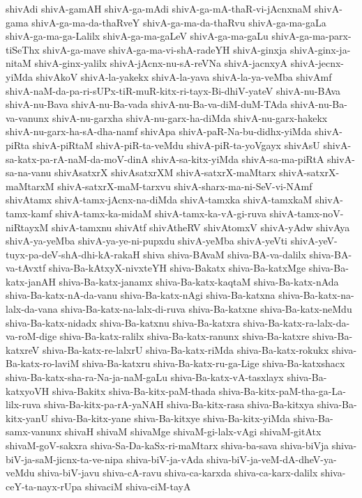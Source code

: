 {shivAdi
shivA-gamAH
shivA-ga-mAdi
shivA-ga-mA-thaR-vi-jAcnxnaM
shivA-gama
shivA-ga-ma-da-thaRveY
shivA-ga-ma-da-thaRvu
shivA-ga-ma-gaLa
shivA-ga-ma-ga-Lalilx
shivA-ga-ma-gaLeV
shivA-ga-ma-gaLu
shivA-ga-ma-parx-tiSeThx
shivA-ga-mave
shivA-ga-ma-vi-shA-radeYH
shivA-ginxja
shivA-ginx-ja-nitaM
shivA-ginx-yalilx
shivA-jAcnx-nu-sA-reVNa
shivA-jacnxyA
shivA-jecnx-yiMda
shivAkoV
shivA-la-yakekx
shivA-la-yava
shivA-la-ya-veMba
shivAmf
shivA-naM-da-pa-ri-sUPx-tiR-muR-kitx-ri-tayx-Bi-dhiV-yateV
shivA-nu-BAva
shivA-nu-Bava
shivA-nu-Ba-vada
shivA-nu-Ba-va-diM-duM-TAda
shivA-nu-Ba-va-vanunx
shivA-nu-garxha
shivA-nu-garx-ha-diMda
shivA-nu-garx-hakekx
shivA-nu-garx-ha-sA-dha-namf
shivApa
shivA-paR-Na-bu-didhx-yiMda
shivA-piRta
shivA-piRtaM
shivA-piR-ta-veMdu
shivA-piR-ta-yoVgayx
shivAsU
shivA-sa-katx-pa-rA-naM-da-moV-dinA
shivA-sa-kitx-yiMda
shivA-sa-ma-piRtA
shivA-sa-na-vanu
shivAsatxrX
shivAsatxrXM
shivA-satxrX-maMtarx
shivA-satxrX-maMtarxM
shivA-satxrX-maM-tarxvu
shivA-sharx-ma-ni-SeV-vi-NAmf
shivAtamx
shivA-tamx-jAcnx-na-diMda
shivA-tamxka
shivA-tamxkaM
shivA-tamx-kamf
shivA-tamx-ka-midaM
shivA-tamx-ka-vA-gi-ruva
shivA-tamx-noV-niRtayxM
shivA-tamxnu
shivAtf
shivAtheRV
shivAtomxV
shivA-yAdw
shivAya
shivA-ya-yeMba
shivA-ya-ye-ni-pupxdu
shivA-yeMba
shivA-yeVti
shivA-yeV-tuyx-pa-deV-shA-dhi-kA-rakaH
shiva
shiva-BAvaM
shiva-BA-va-dalilx
shiva-BA-va-tAvxtf
shiva-Ba-kAtxyX-nivxteYH
shiva-Bakatx
shiva-Ba-katxMge
shiva-Ba-katx-janAH
shiva-Ba-katx-janamx
shiva-Ba-katx-kaqtaM
shiva-Ba-katx-nAda
shiva-Ba-katx-nA-da-vanu
shiva-Ba-katx-nAgi
shiva-Ba-katxna
shiva-Ba-katx-na-lalx-da-vana
shiva-Ba-katx-na-lalx-di-ruva
shiva-Ba-katxne
shiva-Ba-katx-neMdu
shiva-Ba-katx-nidadx
shiva-Ba-katxnu
shiva-Ba-katxra
shiva-Ba-katx-ra-lalx-da-va-roM-dige
shiva-Ba-katx-ralilx
shiva-Ba-katx-ranunx
shiva-Ba-katxre
shiva-Ba-katxreV
shiva-Ba-katx-re-lalxrU
shiva-Ba-katx-riMda
shiva-Ba-katx-rokukx
shiva-Ba-katx-ro-laviM
shiva-Ba-katxru
shiva-Ba-katx-ru-ga-Lige
shiva-Ba-katxshacx
shiva-Ba-katx-sha-ra-Na-ja-naM-gaLu
shiva-Ba-katx-vA-tasxlayx
shiva-Ba-katxyoVH
shiva-Bakitx
shiva-Ba-kitx-paM-thada
shiva-Ba-kitx-paM-tha-ga-La-lilx-ruva
shiva-Ba-kitx-pa-rA-yaNAH
shiva-Ba-kitx-rasa
shiva-Ba-kitxya
shiva-Ba-kitx-yanU
shiva-Ba-kitx-yane
shiva-Ba-kitxye
shiva-Ba-kitx-yiMda
shiva-Ba-samx-vanunx
shivaH
shivaM
shivaMge
shivaM-gi-lalx-vAgi
shivaM-gitAtx
shivaM-goV-sakxra
shiva-Sa-Da-kaSx-ri-maMtarx
shiva-ba-sava
shiva-biVja
shiva-biV-ja-saM-jicnx-ta-ve-nipa
shiva-biV-ja-vAda
shiva-biV-ja-veM-dA-dheV-ya-veMdu
shiva-biV-javu
shiva-cA-ravu
shiva-ca-karxda
shiva-ca-karx-dalilx
shiva-ceY-ta-nayx-rUpa
shivaciM
shiva-ciM-tayA
}
